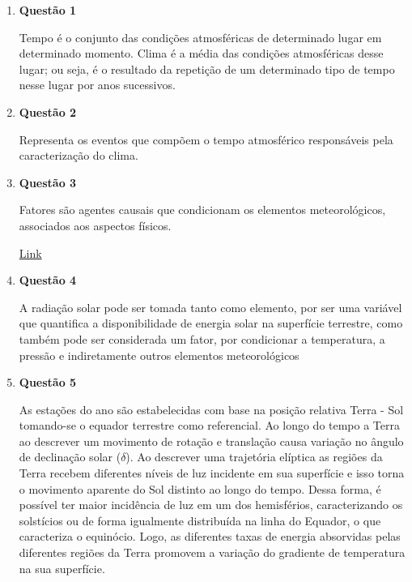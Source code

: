 \documentclass[a4paper, 12pt]{article}
\begin{document}
	\begin{enumerate}
		\item[]\textbf{Questão 1} 
		
		\hspace{1cm}Tempo é o conjunto das condições atmosféricas de determinado lugar em determinado momento. Clima é a média das condições atmosféricas desse lugar; ou seja, é o resultado da repetição de um determinado tipo de tempo nesse lugar por anos sucessivos.
		
		\item[]\textbf{Questão 2} 
		
		\hspace{1cm}Representa os eventos que compõem o tempo atmosférico responsáveis pela caracterização do clima.
		
		\item[]\textbf{Questão 3} 
		
		\hspace{1cm}Fatores são agentes causais que
		condicionam os elementos meteorológicos, associados aos aspectos físicos.
		
		\href{http://www.leb.esalq.usp.br/leb/aulas/lce306/Aula2_2012.pdf}{Link}
		
		\item[]\textbf{Questão 4}
		
		\hspace{1cm}A radiação solar pode ser tomada
		tanto como elemento, por ser uma variável
		que quantifica a disponibilidade de energia
		solar na superfície terrestre, como também
		pode ser considerada um fator, por
		condicionar a temperatura, a pressão e
		indiretamente outros elementos meteorológicos
		
		\item[]\textbf{Questão 5} 
		
		\hspace{1cm}As estações do ano são estabelecidas com base na posição relativa Terra - Sol tomando-se o equador terrestre como referencial. Ao longo do tempo a Terra ao descrever um movimento de rotação e translação causa variação no ângulo de declinação solar ($\delta$). Ao descrever uma trajetória elíptica as regiões da Terra recebem diferentes níveis de luz incidente em sua superfície e isso torna o movimento aparente do Sol distinto ao longo do tempo. Dessa forma, é possível ter maior incidência de luz em um dos hemisférios, caracterizando os solstícios ou de forma igualmente distribuída na linha do Equador, o que caracteriza o equinócio. Logo, as diferentes taxas de energia absorvidas pelas diferentes regiões da Terra promovem a variação do gradiente de temperatura na sua superfície.
		

\end{enumerate}
\end{document}
